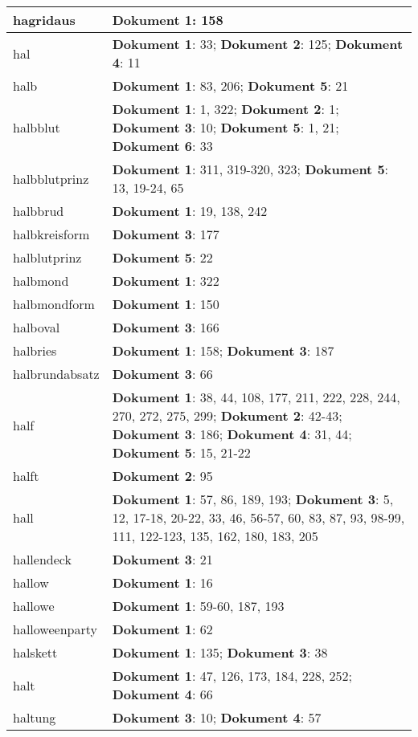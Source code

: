\documentclass[a5paper]{article}
\begin{document}
\begin{longtable}[l]{|l|p{3in}|}
\hline
hagridaus & \textbf{Dokument 1}: 158 \\
\hline
hal & \textbf{Dokument 1}: 33; \textbf{Dokument 2}: 125; \textbf{Dokument 4}: 11 \\
\hline
halb & \textbf{Dokument 1}: 83, 206; \textbf{Dokument 5}: 21 \\
\hline
halbblut & \textbf{Dokument 1}: 1, 322; \textbf{Dokument 2}: 1; \textbf{Dokument 3}: 10; \textbf{Dokument 5}: 1, 21; \textbf{Dokument 6}: 33 \\
\hline
halbblutprinz & \textbf{Dokument 1}: 311, 319-320, 323; \textbf{Dokument 5}: 13, 19-24, 65 \\
\hline
halbbrud & \textbf{Dokument 1}: 19, 138, 242 \\
\hline
halbkreisform & \textbf{Dokument 3}: 177 \\
\hline
halblutprinz & \textbf{Dokument 5}: 22 \\
\hline
halbmond & \textbf{Dokument 1}: 322 \\
\hline
halbmondform & \textbf{Dokument 1}: 150 \\
\hline
halboval & \textbf{Dokument 3}: 166 \\
\hline
halbries & \textbf{Dokument 1}: 158; \textbf{Dokument 3}: 187 \\
\hline
halbrundabsatz & \textbf{Dokument 3}: 66 \\
\hline
half & \textbf{Dokument 1}: 38, 44, 108, 177, 211, 222, 228, 244, 270, 272, 275, 299; \textbf{Dokument 2}: 42-43; \textbf{Dokument 3}: 186; \textbf{Dokument 4}: 31, 44; \textbf{Dokument 5}: 15, 21-22 \\
\hline
halft & \textbf{Dokument 2}: 95 \\
\hline
hall & \textbf{Dokument 1}: 57, 86, 189, 193; \textbf{Dokument 3}: 5, 12, 17-18, 20-22, 33, 46, 56-57, 60, 83, 87, 93, 98-99, 111, 122-123, 135, 162, 180, 183, 205 \\
\hline
hallendeck & \textbf{Dokument 3}: 21 \\
\hline
hallow & \textbf{Dokument 1}: 16 \\
\hline
hallowe & \textbf{Dokument 1}: 59-60, 187, 193 \\
\hline
halloweenparty & \textbf{Dokument 1}: 62 \\
\hline
halskett & \textbf{Dokument 1}: 135; \textbf{Dokument 3}: 38 \\
\hline
halt & \textbf{Dokument 1}: 47, 126, 173, 184, 228, 252; \textbf{Dokument 4}: 66 \\
\hline
haltung & \textbf{Dokument 3}: 10; \textbf{Dokument 4}: 57 \\

\end{longtable}
\end{document}
